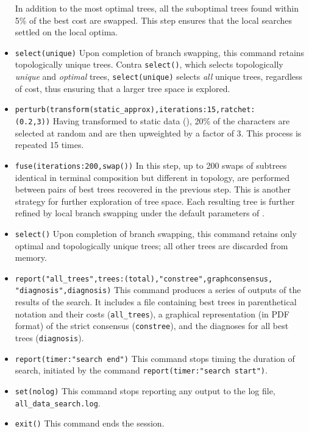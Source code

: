 \begin{itemize}
In addition to the most optimal trees, all the suboptimal trees found within 5\% of the best cost are swapped.
 This step ensures that the local searches settled on the local optima.
\item \texttt{select(unique)} Upon completion of branch swapping, this command retains topologically unique trees.
Contra \texttt{select()}, which selects topologically \emph{unique} and \emph{optimal} trees,  \texttt{select(unique)} 
selects \emph{all} unique trees, regardless of cost, thus ensuring that a larger tree space is explored.
\item \texttt{perturb(transform(static\_approx),iterations:15,ratchet:\\(0.2,3))} Having transformed to static data 
(), 20\% of the characters are selected at random and are then upweighted by 
a factor of $3$.  This process is repeated 15 times.
\item \texttt{fuse(iterations:200,swap())} In this step, up to 200 swaps of subtrees identical in terminal 
composition but different in topology, are performed between pairs of best trees recovered in the previous 
step. This is another strategy for further exploration of tree space. Each resulting tree is further refined by 
local branch swapping under the default parameters of .
\item \texttt{select()} Upon completion of branch swapping, this command retains only optimal and 
topologically unique trees; all other trees are discarded from memory.
\item \texttt{report("all\_trees",trees:(total),"constree",graphconsensus,\\"diagnosis",diagnosis)} This command 
produces a series of outputs of the results of the search. It includes a file containing best trees in parenthetical 
notation and their costs (\texttt{all\_trees}), a graphical representation (in PDF format) of the strict consensus 
(\texttt{constree}), and the diagnoses for all best trees (\texttt{diagnosis}).
\item \texttt{report(timer:"search end")} This command stops timing the duration of search, initiated by the 
command \texttt{report(timer:"search start")}.
\item \texttt{set(nolog)} This command stops reporting any output to the log file, \texttt{all\_data\_search.log}.
\item \texttt{exit()} This command ends the \poy session.
\end{itemize}

